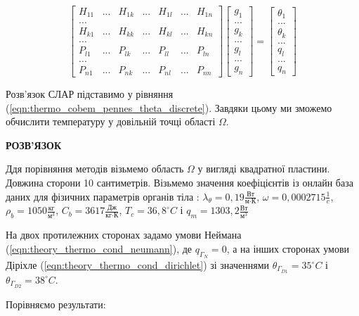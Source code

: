 \begin{equation*}
  \begin{bmatrix}
    H_{11} & ... & H_{1k} & ... & H_{1l} & ...  & H_{1n} \\
    ... \\
    H_{k1} & ... & H_{kk} & ... & H_{kl} & ...  & H_{kn} \\
    ... \\
    P_{l1} & ... & P_{lk} & ... & P_{ll} & ...  & P_{ln} \\
    ... \\
    P_{n1} & ... & P_{nk} & ... & P_{nl} & ...  & P_{nn}
  \end{bmatrix}
  \begin{bmatrix}
    g_1 \\
    ...   \\
    g_k \\
    ... \\
    g_l \\
    ... \\
    g_n
  \end{bmatrix}
  =
  \begin{bmatrix}
    \theta_1 \\
    ...   \\
    \theta_k \\
    ... \\
    q_l \\
    ... \\
    q_n
  \end{bmatrix}
\end{equation*}

\noindent Розв'язок СЛАР підставимо у рівняння (\ref{eqn:thermo_cobem_pennes_theta_discrete}). Завдяки цьому ми зможемо
обчислити температуру у довільній точці області $\Omega$.

\begin{center}
  \textbf{РОЗВ’ЯЗОК}
\end{center}

Ддя порівняння методів візьмемо область $\Omega$ у вигляді квадратної пластини. Довжина сторони 10 сантиметрів. Візьмемо
значення коефіцієнтів із онлайн база даних для фізичних параметрів органів тіла \cite{database-tissue-properties}:
$\lambda_{\theta} = 0,19 \frac{\text{Вт}}{\text{м}\cdot\text{К}}$, $\omega = 0,0002715 \frac{1}{c}$, $\rho_b = 1050
\frac{\text{кг}}{\text{м}^3}$, $C_b = 3617 \frac{\text{Дж}}{\text{кг}\cdot\text{К}}$, $T_c = {36,8}^\circ C$ і $q_m =
1303,2 \frac{\text{Вт}}{\text{м}^3}$ 

На двох протилежних сторонах задамо умови Неймана (\ref{eqn:theory_thermo_cond_neumann}), де $q_{\Gamma_N} = 0$, а на
інших сторонах умови Діріхле (\ref{eqn:theory_thermo_cond_dirichlet}) зі значеннями $\theta_{\Gamma_{D1}} = 35^\circ C$
і $\theta_{\Gamma_{D2}} = 38^\circ C$.

Порівняємо результати:
